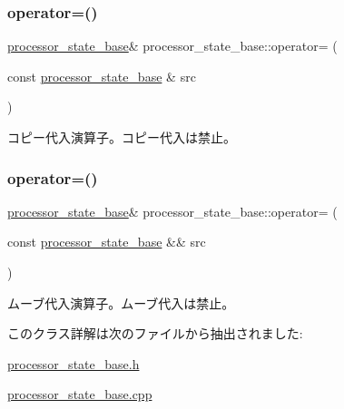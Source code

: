 \subsubsection{\texorpdfstring{operator=()}{operator=()}\hspace{0.1cm}{\footnotesize\ttfamily [1/2]}}
{\footnotesize\ttfamily \hyperlink{classprocessor__state__base}{processor\+\_\+state\+\_\+base}\& processor\+\_\+state\+\_\+base\+::operator= (\begin{DoxyParamCaption}\item[{const \hyperlink{classprocessor__state__base}{processor\+\_\+state\+\_\+base} \&}]{src }\end{DoxyParamCaption})\hspace{0.3cm}{\ttfamily [delete]}}

コピー代入演算子。コピー代入は禁止。 \hypertarget{classprocessor__state__base_a99397522239060856bcca363c221e279}{}\label{classprocessor__state__base_a99397522239060856bcca363c221e279} 
\subsubsection{\texorpdfstring{operator=()}{operator=()}\hspace{0.1cm}{\footnotesize\ttfamily [2/2]}}
{\footnotesize\ttfamily \hyperlink{classprocessor__state__base}{processor\+\_\+state\+\_\+base}\& processor\+\_\+state\+\_\+base\+::operator= (\begin{DoxyParamCaption}\item[{const \hyperlink{classprocessor__state__base}{processor\+\_\+state\+\_\+base} \&\&}]{src }\end{DoxyParamCaption})\hspace{0.3cm}{\ttfamily [delete]}}

ムーブ代入演算子。ムーブ代入は禁止。 

このクラス詳解は次のファイルから抽出されました\+:\begin{DoxyCompactItemize}
\item 
\hyperlink{processor__state__base_8h}{processor\+\_\+state\+\_\+base.\+h}\item 
\hyperlink{processor__state__base_8cpp}{processor\+\_\+state\+\_\+base.\+cpp}\end{DoxyCompactItemize}
